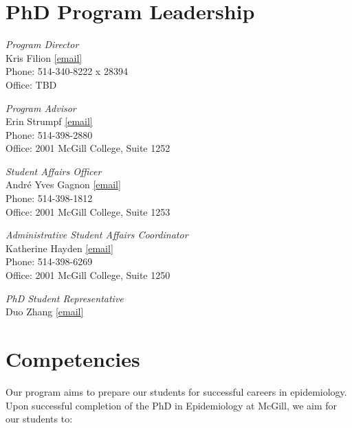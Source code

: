 \documentclass[
  letterpaper,
  DIV=11,
  numbers=noendperiod]{scrreprt}
\begin{document}
\section{PhD Program Leadership}\label{phd-program-leadership}

\emph{Program Director}\\
Kris Filion \href{mailto:kristian.filion@mcgill.ca}{{[}email{]}}\\
Phone: 514-340-8222 x 28394\\
Office: TBD

\emph{Program Advisor}\\
Erin Strumpf \href{mailto:erin.strumpf@mcgill.ca}{{[}email{]}}\\
Phone: 514-398-2880\\
Office: 2001 McGill College, Suite 1252

\emph{Student Affairs Officer}\\
André Yves Gagnon \href{mailto:gradadmin.eboh@mcgill.ca}{{[}email{]}}\\
Phone: 514-398-1812\\
Office: 2001 McGill College, Suite 1253

\emph{Administrative Student Affairs Coordinator}\\
Katherine Hayden \href{mailto:gradcoord2.eboh@mcgill.ca}{{[}email{]}}\\
Phone: 514-398-6269\\
Office: 2001 McGill College, Suite 1250

\emph{PhD Student Representative}\\
Duo Zhang \href{mailto:duo.zhang5@mail.mcgill.ca}{{[}email{]}}

\section{Competencies}\label{competencies}

Our program aims to prepare our students for successful careers in
epidemiology. Upon successful completion of the PhD in Epidemiology at
McGill, we aim for our students to:
\end{document}
